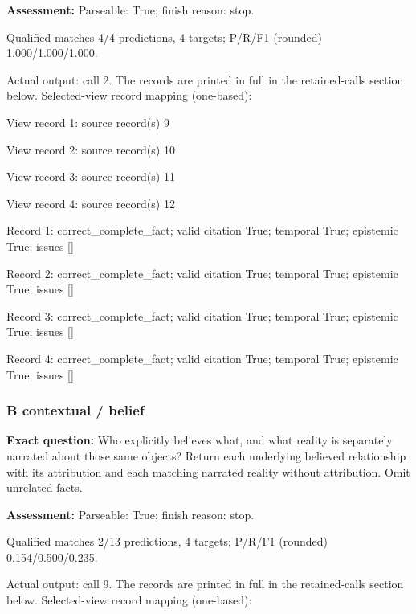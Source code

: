 \noindent\textbf{Assessment:} Parseable: True; finish reason: stop.

Qualified matches 4/4 predictions, 4 targets; P/R/F1 (rounded) 1.000/1.000/1.000.\par

Actual output: call 2. The records are printed in full in the retained-calls section below. Selected-view record mapping (one-based):

View record 1: source record(s) 9\par

View record 2: source record(s) 10\par

View record 3: source record(s) 11\par

View record 4: source record(s) 12\par

Record 1: correct\_complete\_fact; valid citation True; temporal True; epistemic True; issues []\par

Record 2: correct\_complete\_fact; valid citation True; temporal True; epistemic True; issues []\par

Record 3: correct\_complete\_fact; valid citation True; temporal True; epistemic True; issues []\par

Record 4: correct\_complete\_fact; valid citation True; temporal True; epistemic True; issues []\par

\subsubsection*{B contextual / belief}

\noindent\textbf{Exact question:} Who explicitly believes what, and what reality is separately narrated about those same objects? Return each underlying believed relationship with its attribution and each matching narrated reality without attribution. Omit unrelated facts.\par

\noindent\textbf{Assessment:} Parseable: True; finish reason: stop.

Qualified matches 2/13 predictions, 4 targets; P/R/F1 (rounded) 0.154/0.500/0.235.\par

Actual output: call 9. The records are printed in full in the retained-calls section below. Selected-view record mapping (one-based):

